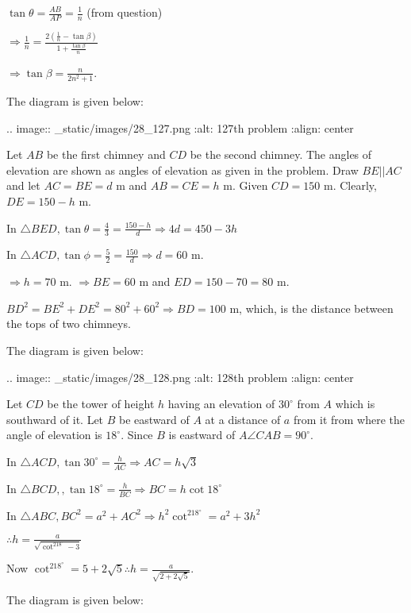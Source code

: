   $\tan\theta = \frac{AB}{AP} = \frac{1}{n}$ (from question)

  $\Rightarrow \frac{1}{n} = \frac{2\left(\frac{1}{n} - \tan\beta\right)}{1 + \frac{\tan\beta}{n}}$

  $\Rightarrow \tan\beta = \frac{n}{2n^2 + 1}$.

\item The diagram is given below:

  .. image:: _static/images/28_127.png
  :alt: 127th problem
  :align: center

  Let $AB$ be the first chimney and $CD$ be the second chimney. The angles of elevation are
  shown as angles of elevation as given in the problem. Draw $BE||AC$ and let $AC = BE = d$ m
  and $AB = CE = h$ m. Given $CD = 150$ m. Clearly, $DE = 150 - h$ m.

  In $\triangle BED, \tan\theta = \frac{4}{3} = \frac{150 - h}{d} \Rightarrow 4d = 450 - 3h$

  In $\triangle ACD, \tan\phi = \frac{5}{2} = \frac{150}{d} \Rightarrow d = 60$ m.

  $\Rightarrow h = 70$ m. $\Rightarrow BE = 60$ m and $ED = 150 - 70 = 80$ m.

  $BD^2 = BE^2 + DE^2 = 80^2 + 60^2 \Rightarrow BD = 100$ m, which, is the distance between the tops
  of two chimneys.

\item The diagram is given below:

  .. image:: _static/images/28_128.png
  :alt: 128th problem
  :align: center

  Let $CD$ be the tower of height $h$ having an elevation of $30^\circ$ from $A$
  which is southward of it. Let $B$ be eastward of $A$ at a distance of $a$ from it
  from where the angle of elevation is $18^\circ$. Since $B$ is eastward of $A
  \angle CAB = 90^\circ$.

  In $\triangle ACD, \tan 30^\circ = \frac{h}{AC} \Rightarrow AC = h\sqrt{3}$

  In $\triangle BCD,, \tan18^\circ = \frac{h}{BC} \Rightarrow BC = h\cot18^\circ$

  In $\triangle ABC, BC^2 = a^2 + AC^2 \Rightarrow h^2\cot^218^\circ = a^2 + 3h^2$

  $\therefore h = \frac{a}{\sqrt{\cot^218^\circ - 3}}$

  Now $\cot^218^\circ = 5 + 2\sqrt{5} \therefore h = \frac{a}{\sqrt{2 + 2\sqrt{5}}}$.

\item The diagram is given below:

